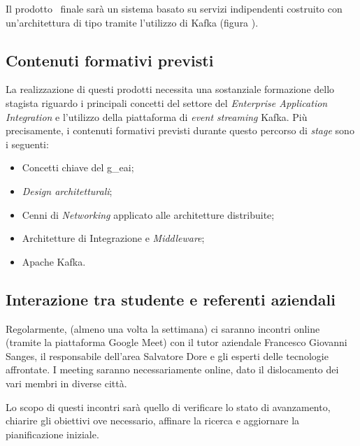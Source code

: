 Il prodotto \software\ finale sarà un sistema basato su servizi indipendenti costruito con un'architettura di tipo  tramite l'utilizzo di Kafka (figura \thefigure).

\subsection{Contenuti formativi previsti}

La realizzazione di questi prodotti necessita una sostanziale formazione dello stagista riguardo i principali concetti del settore del \textit{Enterprise Application Integration} e l'utilizzo della piattaforma di \textit{event streaming} Kafka.
Più precisamente, i contenuti formativi previsti durante questo percorso di \textit{stage} sono i seguenti:
\begin{itemize}
  \item Concetti chiave del \gls{g_eai};
  \item \textit{Design architetturali};
  \item Cenni di \textit{Networking} applicato alle architetture distribuite;
  \item Architetture di Integrazione e \textit{Middleware};
  \item Apache Kafka.
\end{itemize}

\subsection{Interazione tra studente e referenti aziendali}
Regolarmente, (almeno una volta la settimana) ci saranno incontri online (tramite la piattaforma Google Meet) con il tutor aziendale Francesco Giovanni Sanges, il responsabile dell’area  Salvatore Dore e gli esperti delle tecnologie affrontate.
I meeting saranno necessariamente online, dato il dislocamento dei vari membri in diverse città.

Lo scopo di questi incontri sarà quello di verificare lo stato di avanzamento, chiarire gli obiettivi ove necessario, affinare la ricerca e aggiornare la pianificazione iniziale.

